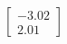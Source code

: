 \documentclass[preview]{standalone}
\begin{document}
\begin{align*}
\begin{bmatrix} -3.02 \\ 2.01 \end{bmatrix}
\end{align*}
\end{document}
